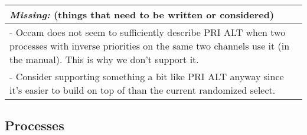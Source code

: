 \documentclass[11pt,oneside,a4paper]{article}
\newcommand{\missing}[1]{
\begin{tabular}{|p{11cm}|}
\hline
\emph{Missing:} {\scriptsize (things that need to be written or considered)} \\
\hline
#1
\hline
\end{tabular}
}
\begin{document}
\missing{
- Occam does not seem to sufficiently describe PRI ALT when two processes with inverse priorities
on the same two channels use it (in the manual). This is why we don't support it. \\
- Consider supporting something a bit like PRI ALT anyway since it's easier to build on top of
than the current randomized select. \\
}


\subsection{Processes}
\end{document}
